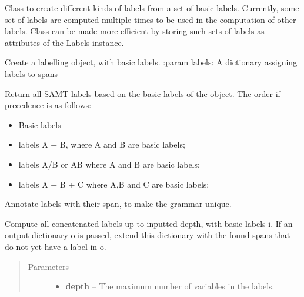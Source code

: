 \documentclass[letterpaper,10pt,english]{sphinxmanual}
\begin{document}
\begin{fulllineitems}
\label{labelling:labelling.Labels}
Class to create different kinds of labels from a set
of basic labels. Currently, some set of labels are
computed multiple times to be used in the computation
of other labels. Class can be made more efficient by storing
such sets of labels as attributes of the Labels instance.

Create a labelling object, with basic labels.
:param labels:  A dictionary assigning labels to spans

\begin{fulllineitems}
\label{labelling:labelling.Labels.SAMT_labels}
Return all SAMT labels based on the basic
labels of the object. The order if precedence is as follows:
\begin{itemize}
\item {} 
Basic labels

\item {} 
labels A + B, where A and B are basic labels;

\item {} 
labels A/B or AB where A and B are basic labels;

\item {} 
labels A + B + C where A,B and C are basic labels;

\end{itemize}

\end{fulllineitems}


\begin{fulllineitems}
\label{labelling:labelling.Labels.annotate_span}
Annotate labels with their span, to make the
grammar unique.

\end{fulllineitems}


\begin{fulllineitems}
\label{labelling:labelling.Labels.concat}
Compute all concatenated labels up to inputted depth,
with basic labels i.
If an output dictionary o is passed, extend this dictionary
with the found spans that do not yet have a label in o.
\begin{quote}\begin{description}
\item[{Parameters}] \leavevmode\begin{itemize}
\item {} 
\textbf{depth} -- The maximum number of variables in the labels.


\end{itemize}
\end{description}
\end{quote}
\end{fulllineitems}
\end{fulllineitems}
\end{document}
